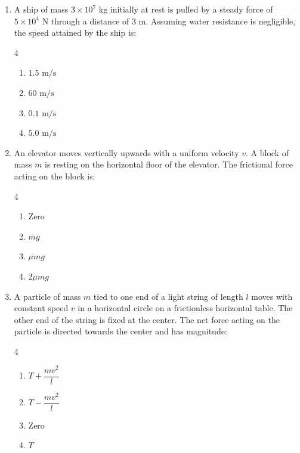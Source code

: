 \documentclass[11pt,a4paper]{article}
\begin{document}
\begin{enumerate}[label=\textbf{\arabic*.},leftmargin=18pt,itemsep=8pt]
  \item A ship of mass $3 \times 10^7\text{ kg}$ initially at rest is pulled by a steady force of $5 \times 10^4\text{ N}$ through a distance of $3\text{ m}$. Assuming water resistance is negligible, the speed attained by the ship is:
  \begin{multicols}{4}
    \begin{enumerate}[label=(\Alph*)]
      \item $1.5\text{ m/s}$
      \item $60\text{ m/s}$
      \item $0.1\text{ m/s}$
      \item $5.0\text{ m/s}$
    \end{enumerate}
  \end{multicols}

  \item An elevator moves vertically upwards with a uniform velocity $v$. A block of mass $m$ is resting on the horizontal floor of the elevator. The frictional force acting on the block is:
  \begin{multicols}{4}
    \begin{enumerate}[label=(\Alph*)]
      \item $\text{Zero}$
      \item $mg$
      \item $\mu mg$
      \item $2\mu mg$
    \end{enumerate}
  \end{multicols}

  \item A particle of mass $m$ tied to one end of a light string of length $l$ moves with constant speed $v$ in a horizontal circle on a frictionless horizontal table. The other end of the string is fixed at the center. The net force acting on the particle is directed towards the center and has magnitude:
  \begin{multicols}{4}
    \begin{enumerate}[label=(\Alph*)]
      \item $T + \dfrac{mv^2}{l}$
      \item $T - \dfrac{mv^2}{l}$
      \item $\text{Zero}$
      \item $T$
    \end{enumerate}
  \end{multicols}


\end{enumerate}
\end{document}
